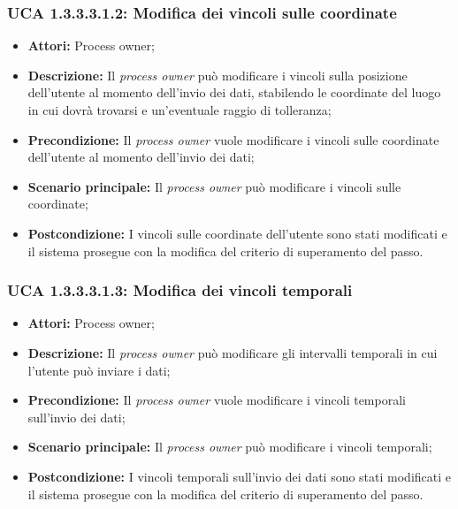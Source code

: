 \hypertarget{A1.3.3.3.1.2}{}
\subsubsection{UCA 1.3.3.3.1.2: Modifica dei vincoli sulle coordinate}
\begin{itemize}
\item \textbf{Attori:} Process owner;
\item \textbf{Descrizione:}
Il \textit{process owner} può modificare i vincoli sulla posizione dell'utente al momento dell'invio dei dati, stabilendo le coordinate del luogo in cui dovrà trovarsi e un'eventuale raggio di tolleranza;
\item \textbf{Precondizione:}
Il \textit{process owner} vuole modificare i vincoli sulle coordinate dell'utente al momento dell'invio dei dati;
\item \textbf{Scenario principale:}
Il \textit{process owner} può modificare i vincoli sulle coordinate;
\item \textbf{Postcondizione:}
I vincoli sulle coordinate dell'utente sono stati modificati e il sistema prosegue con la modifica del criterio di superamento del passo.
\end{itemize}

\hypertarget{A1.3.3.3.1.3}{}
\subsubsection{UCA 1.3.3.3.1.3: Modifica dei vincoli temporali}
\begin{itemize}
\item \textbf{Attori:} Process owner;
\item \textbf{Descrizione:}
Il \textit{process owner} può modificare gli intervalli temporali in cui l'utente può inviare i dati;
\item \textbf{Precondizione:}
Il \textit{process owner} vuole modificare i vincoli temporali sull'invio dei dati;
\item \textbf{Scenario principale:}
Il \textit{process owner} può modificare i vincoli temporali;
\item \textbf{Postcondizione:}
I vincoli temporali sull'invio dei dati sono stati modificati e il sistema prosegue con la modifica del criterio di superamento del passo.
\end{itemize}

